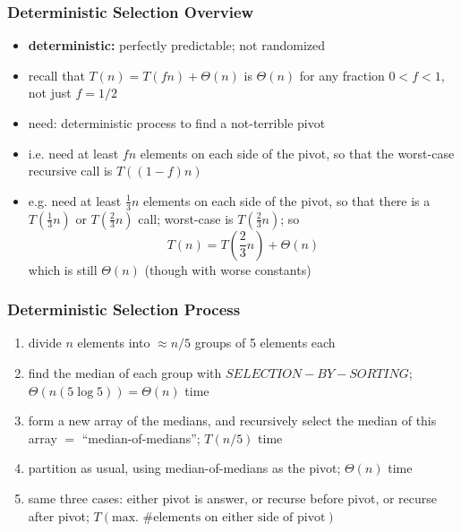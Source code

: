\documentclass[10pt,aspectratio=169]{beamer}
\begin{document}
\begin{frame} \frametitle{Deterministic Selection Overview}
\begin{itemize}
  \item \textbf{deterministic:} perfectly predictable; not randomized
  \item recall that $T(n) = T(fn) + \Theta(n)$ is $\Theta(n)$ for any fraction $0<f<1$,
    not just $f=1/2$
  \item need: deterministic process to find a not-terrible pivot
  \item i.e. need at least $fn$ elements on each side of the pivot, so that
    the worst-case recursive call is $T((1-f)n)$
  \item e.g. need at least $\frac{1}{3}n$ elements on each side of the pivot,
    so that there is a $T(\frac{1}{3}n)$ or $T(\frac{2}{3}n)$ call;
    worst-case is $T(\frac{2}{3}n)$; so
    \[ T(n)=T(\frac{2}{3}n) + \Theta(n) \]
    which is still $\Theta(n)$ (though with worse constants)
\end{itemize}
\end{frame}

\begin{frame} \frametitle{Deterministic Selection Process}
\begin{enumerate}
  \item divide $n$ elements into $\approx n/5$ groups of 5 elements each
  \item find the median of each group with $SELECTION-BY-SORTING$;
    $\Theta(n(5 \log 5))=\Theta(n)$ time
  \item form a new array of the medians, and recursively select the median
    of this array $=$ ``median-of-medians''; $T(n/5)$ time
  \item partition as usual, using median-of-medians as the pivot; $\Theta(n)$ time
  \item same three cases: either pivot is answer, or recurse before pivot, or
    recurse after pivot; $T(\text{max. \# elements on either side of pivot})$
\end{enumerate}
\end{frame}
\end{document}
